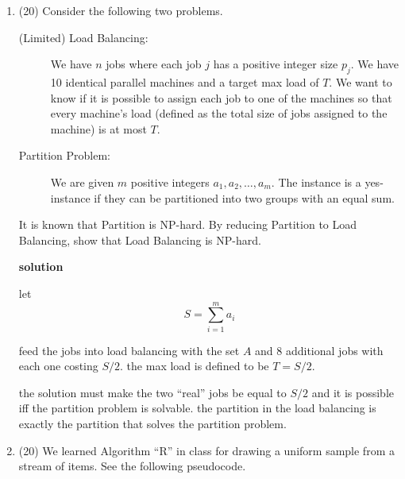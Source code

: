 \documentclass[letterpaper,12pt]{article}
\begin{document}
\begin{enumerate}
\begin{enumerate}
    \item Show that $z_k \leq \frac{1}{e} n$ using the fact that $1+ x \leq e^x$ for all $x$.
    
    \item Show that $|E(X)| \geq (1 - 1/e) n$.
\end{enumerate}

\newpage
\item (20) Consider the following two problems.

\begin{description}
    \item[(Limited) Load Balancing:] We have $n$ jobs where each job $j$ has a positive integer size $p_j$. We have 10 identical parallel machines and a target max load of $T$. We want to know if it is possible to assign each job to one of the machines so that every machine's load (defined as the total size of jobs assigned to the machine) is at most $T$.
    
    \item[Partition Problem:] We are given $m$ positive integers $a_1, a_2, \ldots, a_m$. The instance is a yes-instance if they can be partitioned into two groups with an equal sum.
\end{description}

It is known that Partition is NP-hard. By reducing Partition to Load Balancing, show that Load Balancing is NP-hard.

\textbf{solution}

let \begin{equation}
    S=\sum_{i=1}^{m}a_i
\end{equation}

feed the jobs into load balancing with the set \(A\) and 8 additional jobs with each one costing \(S/2\). the max load is defined to be \(T = S/2\). 

the solution must make the two ``real'' jobs be equal to \(S/2\) and it is possible iff the partition problem is solvable. the partition in the load balancing is exactly the partition that solves the partition problem. 


\newpage
\item (20) We learned Algorithm ``R'' in class for drawing a uniform sample from a stream of items. See the following pseudocode. 

\begin{algorithm}


\end{algorithm}
\end{enumerate}
\end{document}
